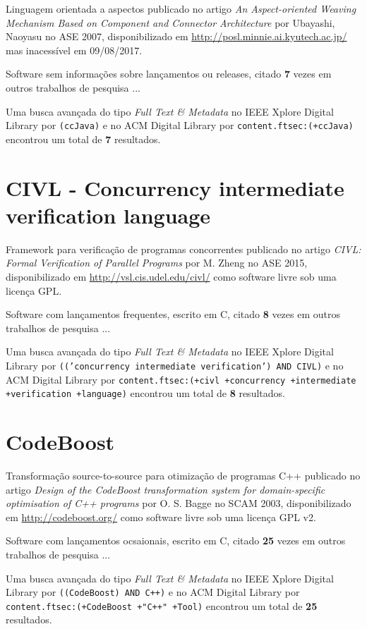 Linguagem orientada a aspectos
publicado no artigo {\it An Aspect-oriented Weaving Mechanism Based on Component and Connector Architecture}
por Ubayashi, Naoyasu
no ASE 2007,
disponibilizado em \url{http://posl.minnie.ai.kyutech.ac.jp/}
mas inacessível em 09/08/2017.

Software sem informações sobre lançamentos ou releases,
citado {\bf 7} vezes em outros trabalhos de pesquisa ...

Uma busca avançada do tipo {\it Full Text \& Metadata} no IEEE Xplore Digital Library por
\texttt{(ccJava)}
e no ACM Digital Library por
\texttt{content.ftsec:(+ccJava)}
encontrou um total de
{\bf 7}
resultados.

\section{CIVL - Concurrency intermediate verification language}

Framework para verificação de programas concorrentes
publicado no artigo {\it CIVL: Formal Verification of Parallel Programs}
por M. Zheng
no ASE 2015,
disponibilizado em \url{http://vsl.cis.udel.edu/civl/}
como software livre
sob uma licença GPL.

Software com lançamentos frequentes,
escrito em C,
citado {\bf 8} vezes em outros trabalhos de pesquisa ...

Uma busca avançada do tipo {\it Full Text \& Metadata} no IEEE Xplore Digital Library por
\texttt{(('concurrency intermediate verification') AND CIVL)}
e no ACM Digital Library por
\texttt{content.ftsec:(+civl +concurrency +intermediate +verification +language)}
encontrou um total de
{\bf 8}
resultados.

\section{CodeBoost}

Transformação source-to-source para otimização de programas C++
publicado no artigo {\it Design of the CodeBoost transformation system for domain-specific optimisation of C++ programs}
por O. S. Bagge
no SCAM 2003,
disponibilizado em \url{http://codeboost.org/}
como software livre
sob uma licença GPL v2.

Software com lançamentos ocsaionais,
escrito em C,
citado {\bf 25} vezes em outros trabalhos de pesquisa ...

Uma busca avançada do tipo {\it Full Text \& Metadata} no IEEE Xplore Digital Library por
\texttt{((CodeBoost) AND C++)}
e no ACM Digital Library por
\texttt{content.ftsec:(+CodeBoost +"C++" +Tool)}
encontrou um total de
{\bf 25}
resultados.

